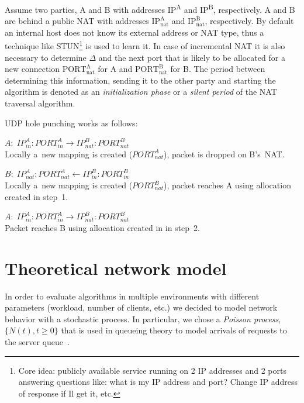 \documentclass{acm_proc_article-sp}
\newcommand{\ignore}[1]{}
\begin{document}
Assume two parties, A and B with addresses IP\textsuperscript{A} and IP\textsuperscript{B}, respectively.
A and B are behind a public NAT with addresses $\text{IP}^{\text{A}}_{\text{nat}}$ and $\text{IP}^{\text{B}}_{\text{nat}}$,
respectively. By default an internal host does not know its external address or NAT type, thus a technique like 
STUN\footnote{Core idea: publicly available service running on 2 IP addresses and 2 ports 
answering questions like: what is my IP address and port? Change IP address of response if Il get it, etc.} 
is used to learn it. In case of incremental NAT it is also necessary to determine $\Delta$ and the next port
that is likely to be allocated for a new connection $\text{PORT}^{\text{A}}_{\text{nat}}$ for A and $\text{PORT}^{\text{B}}_{\text{nat}}$
for B. The period between determining this information, sending it to the other party and starting the algorithm is
denoted as an \emph{initialization phase} or a \emph{silent period}\ignore{\footnote{Since the algorithm itself does nothing.}} of the NAT traversal algorithm.

UDP hole punching works as follows:\\
\begin{compactitem}
 \item [1.] $A: \; IP^A_{in}:PORT^A_{in} \longrightarrow IP^B_{nat}:PORT^B_{nat}$ \\
Locally a~new mapping is created ($PORT^A_{nat}$), packet is dropped on B's~NAT.
 \item [2.] $B: \; IP^A_{nat}:PORT^A_{nat} \longleftarrow  IP^B_{in}:PORT^B_{in}$ \\
Locally a~new mapping is created ($PORT^B_{nat}$), packet reaches A using allocation created in step~1.
 \item [3.] $A: \; IP^A_{in}:PORT^A_{in} \longrightarrow IP^B_{nat}:PORT^B_{nat}$ \\
Packet reaches B using allocation created in in step~2.
\end{compactitem}


\section{Theoretical network model}
In order to evaluate algorithms in multiple environments with different parameters (workload, number of clients, etc.)
we decided to model network behavior with a stochastic process. In particular, we chose a \emph{Poisson process}, $\{N(t), t\geq0\}$ 
that is used in queueing theory to model arrivals of requests to the server queue~\citep{Nelson:1995:PSP:207382}. 
\end{document}
